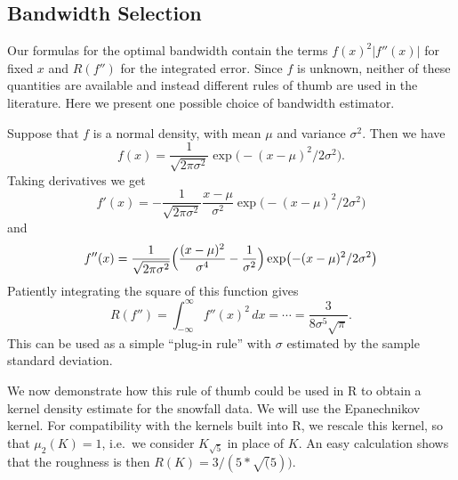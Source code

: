 \documentclass[
  a4paper,
]{article}
\theoremstyle{definition}
\theoremstyle{definition}
\theoremstyle{definition}
\theoremstyle{definition}
\theoremstyle{remark}
\begin{document}
\hypertarget{bwsel}{%
\subsection{Bandwidth Selection}\label{bwsel}}

Our formulas for the optimal bandwidth contain the terms
\(f(x)^2 |f''(x)|\) for fixed \(x\) and \(R(f'')\) for the integrated error.
Since \(f\) is unknown, neither of these quantities are available and instead
different rules of thumb are used in the literature. Here we present
one possible choice of bandwidth estimator.

Suppose that \(f\) is a normal density, with mean \(\mu\) and variance \(\sigma^2\).
Then we have
\begin{equation*}
  f(x)
  = \frac{1}{\sqrt{2\pi\sigma^2}} \exp\bigl( - (x-\mu)^2 / 2\sigma^2 \bigr).
\end{equation*}
Taking derivatives we get
\begin{equation*}
  f'(x)
  = - \frac{1}{\sqrt{2\pi\sigma^2}} \frac{x-\mu}{\sigma^2} \exp\bigl( - (x-\mu)^2 / 2\sigma^2 \bigr)
\end{equation*}
and
\begin{equation*}
  f''(x)
  = \frac{1}{\sqrt{2\pi\sigma^2}}
      \Bigl( \frac{(x-\mu)^2}{\sigma^4} - \frac{1}{\sigma^2} \Bigr)
      \exp\bigl( - (x-\mu)^2 / 2\sigma^2 \bigr)
\end{equation*}
Patiently integrating the square of this function gives
\begin{equation*}
  R(f'')
  = \int_{-\infty}^\infty f''(x)^2 \,dx
  = \cdots
  = \frac{3}{8\sigma^5\sqrt{\pi}}.
\end{equation*}
This can be used as a simple ``plug-in rule'' with \(\sigma\) estimated by the
sample standard deviation.

We now demonstrate how this rule of thumb could be used in R to obtain a kernel
density estimate for the snowfall data. We will use the Epanechnikov kernel.
For compatibility with the kernels built into R, we rescale this kernel, so
that \(\mu_2(K) = 1\), i.e.~we consider \(K_{\sqrt{5}}\) in place of \(K\). An easy
calculation shows that the roughness is then \(R(K) = 3 / (5*\sqrt(5))\).
\end{document}
